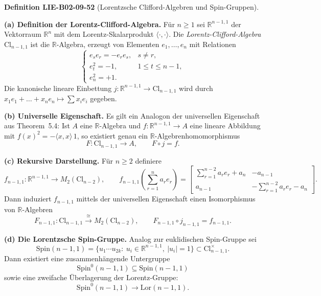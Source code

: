 \documentclass[10pt, letterpaper]{article}
\newcommand{\R}{\mathbb{R}}
\newcommand{\Cl}{\mathrm{Cl}}
\newcommand{\Spin}{\mathrm{Spin}}
\newcommand{\Lor}{\mathrm{Lor}}
\newcommand{\CustomHeading}[3]{%
  \par\medskip\noindent%
  \textbf{#1 #2} \textnormal{(#3)}.\enskip%
}
\newenvironment{DEF}[2]{\begin{unitbox}\CustomHeading{Definition}{#1}{#2}}{\end{unitbox}}
\begin{document}
\begin{DEF}{LIE-B02-09-52}{Lorentzsche Clifford-Algebren und Spin-Gruppen}
\textbf{(a) Definition der Lorentz-Clifford-Algebra.}
Für \(n\ge 1\) sei \(\R^{n-1,1}\) der Vektorraum \(\R^n\) mit dem Lorentz-Skalarprodukt
\(\langle\cdot,\cdot\rangle\).
Die \emph{Lorentz-Clifford-Algebra} \(\Cl_{n-1,1}\) ist die \(\R\)-Algebra,
erzeugt von Elementen \(e_1,\dots,e_n\) mit Relationen
\[
\begin{cases}
e_s e_r = - e_r e_s, & s\ne r,\\[4pt]
e_t^2 = -1, & 1\le t\le n-1,\\[4pt]
e_n^2 = +1.
\end{cases}
\]
Die kanonische lineare Einbettung \(j:\R^{n-1,1}\to\Cl_{n-1,1}\) wird durch
\(x_1 e_1+\dots+x_n e_n\mapsto \sum x_i e_i\) gegeben.

\textbf{(b) Universelle Eigenschaft.}
Es gilt ein Analogon der universellen Eigenschaft aus Theorem~5.4:
Ist \(A\) eine \(\R\)-Algebra und \(f:\R^{n-1,1}\to A\) eine lineare Abbildung mit
\(f(x)^2=-\langle x,x\rangle\,1\), so existiert genau ein
\(\R\)-Algebrenhomomorphismus
\[
F:\Cl_{n-1,1}\longrightarrow A,\qquad F\circ j=f.
\]

\textbf{(c) Rekursive Darstellung.}
Für \(n\ge 2\) definiere
\[
f_{n-1,1}:\R^{n-1,1}\to M_2(\Cl_{n-2}),\qquad
f_{n-1,1}\!\left(\sum_{r=1}^n a_r e_r\right)
=\begin{bmatrix}
\sum_{r=1}^{n-2} a_r e_r + a_n & -a_{n-1}\\[4pt]
a_{n-1} & -\sum_{r=1}^{n-2} a_r e_r - a_n
\end{bmatrix}.
\]
Dann induziert \(f_{n-1,1}\) mittels der universellen Eigenschaft
einen Isomorphismus von \(\R\)-Algebren
\[
F_{n-1,1}:\Cl_{n-1,1}\xrightarrow{\ \cong\ } M_2(\Cl_{n-2}),
\qquad
F_{n-1,1}\circ j_{n-1,1}=f_{n-1,1}.
\]

\textbf{(d) Die Lorentzsche Spin-Gruppe.}
Analog zur euklidischen Spin-Gruppe sei
\[
\Spin(n-1,1)=\{u_1\cdots u_{2k}:\ u_i\in \R^{n-1,1},\ |u_i|=1\}
\subset \Cl_{n-1,1}^\times.
\]
Dann existiert eine zusammenhängende Untergruppe
\[
\Spin^0(n-1,1)\subseteq \Spin(n-1,1)
\]
sowie eine zweifache Überlagerung der Lorentz-Gruppe:
\[
\Spin^0(n-1,1)\longrightarrow \Lor(n-1,1).
\]
\end{DEF}
\end{document}
